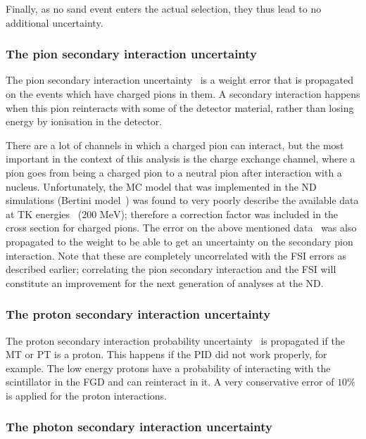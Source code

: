 Finally, as no \gls{sand} event enters the actual selection, they thus
lead to no additional uncertainty.

\subsubsection{The pion secondary interaction uncertainty}
\label{subsec:pionsec}
The pion secondary interaction uncertainty~\cite{TN212} is a weight
error that is propagated on the events which have charged pions in
them. A secondary interaction happens when this pion reinteracts with
some of the detector material, rather than losing energy by ionisation
in the detector.

There are a lot of channels in which a charged pion can interact, but
the most important in the context of this analysis is the charge
exchange channel, where a pion goes from being a charged pion to a
neutral pion after interaction with a nucleus. Unfortunately, the
\Gls{MC} model that was implemented in the \Gls{ND} simulations
(Bertini model~\cite{WRIGHT2015175}) was found to very poorly describe
the available data at \Gls{TK}
energies~\cite{TN125,TN325,Ashery:1981tq} ($200\text{~MeV}$);
therefore a correction factor was included in the cross section for
charged pions. The error on the above mentioned
data~\cite{Ashery:1981tq} was also propagated to the weight to be able
to get an uncertainty on the secondary pion interaction. Note that
these are completely uncorrelated with the \Gls{FSI} errors as
described earlier; correlating the pion secondary interaction and the
\Gls{FSI} will constitute an improvement for the next generation of
analyses at the \Gls{ND}.

\subsubsection{The proton secondary interaction uncertainty}
\label{subsec:protonsec}
The proton secondary interaction probability uncertainty~\cite{TN212}
is propagated if the \Gls{MT} or \Gls{PT} is a proton. This happens if
the \Gls{PID} did not work properly, for example. The low energy
protons have a probability of interacting with the scintillator in the
\Gls{FGD} and can reinteract in it. A very conservative error of
$10\%$ is applied for the proton interactions.

\subsubsection{The photon secondary interaction uncertainty}
\label{subsec:photonsec}


